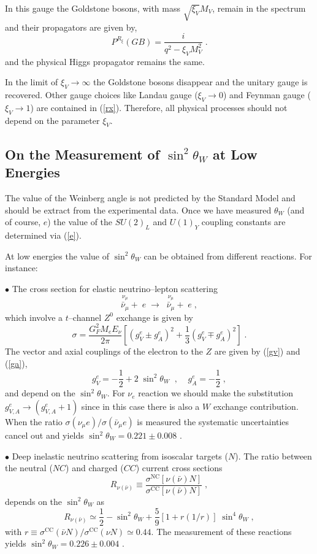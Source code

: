 \documentclass[12pt]{report}
\def\text#1{{\scriptstyle\mathrm{#1}}}
\begin{document}
In this gauge the Goldstone bosons, with mass $\sqrt{\xi_V} M_V$, remain in
the spectrum and their propagators are given by,
\[
P^{R_\xi} (GB) = \frac{i}{q^2 - \xi_V M_V^2} \; .
\]
and the physical Higgs propagator remains the same.

In the limit of $\xi_V \to \infty$ the Goldstone bosons disappear and
the unitary gauge is recovered. Other gauge choices like Landau gauge
($\xi_V \to 0$) and  Feynman gauge ($\xi_V \to 1$) are contained in
(\ref{rx}). Therefore, all physical processes should not depend on the
parameter $\xi_V$.


\subsection{On the Measurement of $\sin^2\theta_W$ at Low Energies}
\indent

The value of the Weinberg angle is not predicted by the Standard
Model and should be extract from the experimental data. Once we have
measured $\theta_W$ (and of course, $e$) the value of the $SU(2)_L$
and $U(1)_Y$ coupling constants are determined via (\ref{e}).

At low energies the value of $\sin^2\theta_W$ can be obtained from
different reactions. For instance:

$\bullet$ The cross section for elastic neutrino--lepton
scattering
\[
\stackrel{\mbox{$\nu_\mu$}}{\mbox{$\bar{\nu}_\mu$}} + \; e \; \to \;\; 
\stackrel{\mbox{$\nu_\mu$}}{\mbox{$\bar{\nu}_\mu$}} + \; e \; ,
\]
which involve a $t$--channel $Z^0$ exchange is given by 
\[
\sigma = \frac{G_F^2 M_e E_\nu}{2 \pi}
\left[ \left(g_V^e \pm  g_A^e \right)^2 + 
\frac{1}{3}   \left( g_V^e \mp  g_A^e \right)^2 \right] \; .
\]
The vector and axial couplings of the electron to the $Z$ are
given by (\ref{gv}) and (\ref{ga}),
\[
g_V^e = -\frac{1}{2} + 2 \; { \sin^2\theta_W}
\;\; , \;\;\;\; 
g_A^e = -\frac{1}{2} \; , 
\]
and depend on the $\sin^2\theta_W$. For  $\nu_e$ reaction we should
make the substitution $g_{V,A}^e \to (g_{V,A}^e + 1)$ since in this
case there is also a $W$ exchange contribution. When the ratio $\sigma
(\nu_\mu e)/\sigma (\bar{\nu}_\mu e)$ is measured the systematic
uncertainties cancel out and yields $\sin^2\theta_W = 0.221 \pm 0.008$
\cite{pdg:98}. 

$\bullet$ Deep inelastic neutrino scattering from isoscalar targets
($N$). The ratio between the neutral ($NC$) and charged ($CC$) current
cross sections
\[
R_{\nu (\bar{\nu})} \equiv \frac{\sigma^{\text{NC}}[\nu (\bar{\nu}) N]}
                    {\sigma^{\text{CC}}[\nu (\bar{\nu}) N]}
                              \; ,
\]
depends on the $\sin^2\theta_W$ as
\[ 
R_{\nu ({ \bar{\nu}})} \simeq \frac{1}{2} - 
{ \sin^2\theta_W} + 
\frac{5}{9} [1 + r { (1/r)}] \; { \sin^4\theta_W} \; ,
\]
with $r \equiv \sigma^{\text{CC}}(\bar{\nu} N)/
\sigma^{\text{CC}}(\nu N)\simeq 0.44$. The measurement of these
reactions yields $\sin^2\theta_W = 0.226 \pm 0.004$ \cite{pdg:98}. 
\end{document}
